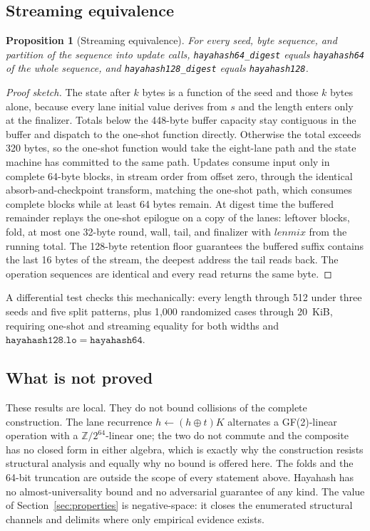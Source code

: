 \documentclass[10pt,a4paper]{article}
\newtheorem{proposition}{Proposition}
\theoremstyle{remark}
\begin{document}
\subsection{Streaming equivalence}
\label{sec:streaming}

\begin{proposition}[Streaming equivalence]
\label{prop:streaming}
For every seed, byte sequence, and partition of the sequence into update
calls, \texttt{hayahash64\_digest} equals \texttt{hayahash64} of the whole
sequence, and \texttt{hayahash128\_digest} equals \texttt{hayahash128}.
\end{proposition}

\begin{proof}[Proof sketch]
The state after \(k\) bytes is a function of the seed and those \(k\) bytes
alone, because every lane initial value derives from \(s\) and the length
enters only at the finalizer.  Totals below the 448-byte buffer capacity stay
contiguous in the buffer and dispatch to the one-shot function directly.
Otherwise the total exceeds 320 bytes, so the one-shot function would take
the eight-lane path and the state machine has committed to the same path.
Updates consume input only in complete 64-byte blocks, in stream order from
offset zero, through the identical absorb-and-checkpoint transform, matching
the one-shot path, which consumes complete blocks while at least 64 bytes
remain.  At digest time the buffered remainder replays the one-shot epilogue
on a copy of the lanes: leftover blocks, fold, at most one 32-byte round,
wall, tail, and finalizer with \(\mathit{lenmix}\) from the running total.
The 128-byte retention floor guarantees the buffered suffix contains the last
16 bytes of the stream, the deepest address the tail reads back.  The
operation sequences are identical and every read returns the same byte.
\end{proof}

A differential test checks this mechanically: every length through 512 under
three seeds and five split patterns, plus 1{,}000 randomized cases through
20~KiB, requiring one-shot and streaming equality for both widths and
\(\mathtt{hayahash128.lo} = \mathtt{hayahash64}\).

\subsection{What is not proved}
\label{sec:notproved}

These results are local.  They do not bound collisions of the complete
construction.  The lane recurrence
\(h \leftarrow (h \oplus t)K\) alternates a GF(2)-linear operation with a
\(\mathbb{Z}/2^{64}\)-linear one; the two do not commute and the composite
has no closed form in either algebra, which is exactly why the construction
resists structural analysis and equally why no bound is offered here.  The
folds and the 64-bit truncation are outside the scope of every statement
above.  Hayahash has no almost-universality bound and no adversarial
guarantee of any kind.  The value of Section~\ref{sec:properties} is
negative-space: it closes the enumerated structural channels and delimits
where only empirical evidence exists.
\end{document}
